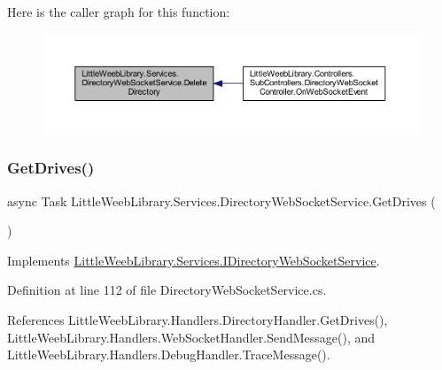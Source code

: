 Here is the caller graph for this function\+:\nopagebreak
\begin{figure}[H]
\begin{center}
\leavevmode
\includegraphics[width=350pt]{class_little_weeb_library_1_1_services_1_1_directory_web_socket_service_ac0af5740848de2340e4d3e9225eeb0d7_icgraph}
\end{center}
\end{figure}
\mbox{\label{class_little_weeb_library_1_1_services_1_1_directory_web_socket_service_a368f502e063381bccfed714d8350dc69}} 
\subsubsection{\texorpdfstring{Get\+Drives()}{GetDrives()}}
{\footnotesize\ttfamily async Task Little\+Weeb\+Library.\+Services.\+Directory\+Web\+Socket\+Service.\+Get\+Drives (\begin{DoxyParamCaption}{ }\end{DoxyParamCaption})}



Implements \mbox{\hyperlink{interface_little_weeb_library_1_1_services_1_1_i_directory_web_socket_service_a079ed5bda7dd1c9fa497bf3a1effacaa}{Little\+Weeb\+Library.\+Services.\+I\+Directory\+Web\+Socket\+Service}}.



Definition at line 112 of file Directory\+Web\+Socket\+Service.\+cs.



References Little\+Weeb\+Library.\+Handlers.\+Directory\+Handler.\+Get\+Drives(), Little\+Weeb\+Library.\+Handlers.\+Web\+Socket\+Handler.\+Send\+Message(), and Little\+Weeb\+Library.\+Handlers.\+Debug\+Handler.\+Trace\+Message().



